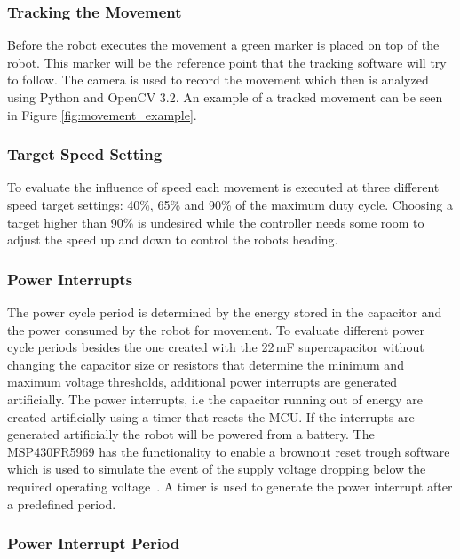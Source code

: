 \subsubsection{Tracking the Movement}

Before the robot executes the movement a green marker is placed on top of the robot.
This marker will be the reference point that the tracking software will try to follow.
The camera is used to record the movement which then is analyzed using Python and OpenCV 3.2.
An example of a tracked movement can be seen in Figure \ref{fig:movement_example}.

\subsubsection{Target Speed Setting}
To evaluate the influence of speed each movement is executed at three different speed target settings: 40\%, 65\% and 90\% of the maximum duty cycle.
Choosing a target higher than 90\% is undesired while the controller needs some room to adjust the speed up and down to control the robots heading.

\subsubsection{Power Interrupts}

The power cycle period is determined by the energy stored in the capacitor and the power consumed by the robot for movement.
To evaluate different power cycle periods besides the one created with the 22\,mF supercapacitor without changing the capacitor size or resistors that determine the minimum and maximum voltage thresholds, additional power interrupts are generated artificially.
The power interrupts, i.e the capacitor running out of energy are created artificially using a timer that resets the MCU.
If the interrupts are generated artificially the robot will be powered from a battery.
The MSP430FR5969 has the functionality to enable a brownout reset trough software which is used to simulate the event of the supply voltage dropping below the required operating voltage~\cite{msp430fr_family_guide_2017}.
A timer is used to generate the power interrupt after a predefined period.

\subsubsection{Power Interrupt Period}

